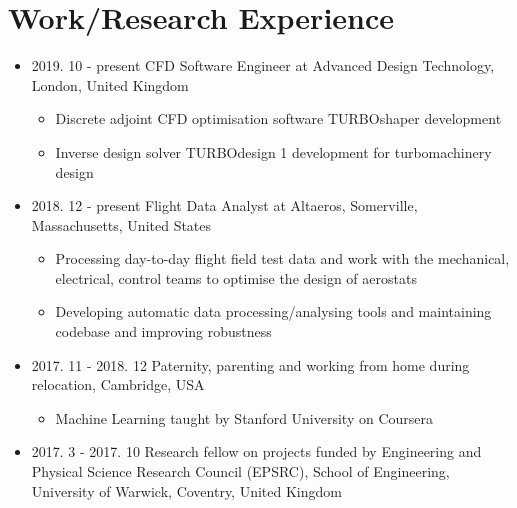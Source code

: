 \documentclass[letterpaper]{article}
\begin{document}
\vspace{-12pt}
\section*{Work/Research Experience}
\vspace{-10pt}
\begin{itemize}
\item  2019. 10 - present CFD Software Engineer at Advanced Design Technology, London, United Kingdom 
\begin{itemize}
\item Discrete adjoint  CFD optimisation software TURBOshaper development
\item Inverse design solver TURBOdesign 1 development for turbomachinery design
\end{itemize} 
\item 2018. 12 - present \hspace{2pt} Flight Data Analyst at Altaeros, Somerville, Massachusetts, United States
	\begin{itemize}
	\item Processing day-to-day flight field test data and work with the mechanical, electrical, control teams to optimise the design of aerostats 
	\item Developing automatic data processing/analysing tools and maintaining codebase and improving robustness
	\end{itemize}
\item 2017. 11 - 2018. 12 \hspace{2pt} Paternity, parenting and working from home during relocation, Cambridge, USA
		\begin{itemize}
		\item Machine Learning taught by Stanford University on Coursera
		\end{itemize}		
\item 2017. 3 - 2017. 10  \hspace{2pt} Research fellow on projects funded by Engineering and Physical Science Research Council (EPSRC), School of Engineering, University of Warwick, Coventry, United Kingdom

\end{itemize}
\end{document}
